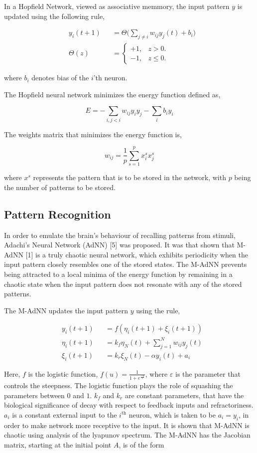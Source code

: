 \documentclass[12pt, letterpaper]{article}
\begin{document}
In a Hopfield Network, viewed as associative memmory, the input pattern $y$ is updated using the following rule,

$$
\begin{aligned}
& y_i(t+1) &&= \Theta\big(\sum_{j \neq i} w_{ij}y_j(t) + b_i \big)\\
& \Theta(z) &&= \begin{cases}
  +1, & z > 0.\\
  -1, & z \le 0.
  \end{cases}
\end{aligned}
$$

where $b_i$ denotes bias of the $i$'th neuron.

The Hopfield neural network minimizes the energy function defined as,

$$
E = -\sum_{i,j < i} w_{ij}y_i y_j - \sum_{i} b_i y_i
$$

The weights matrix that minimizes the energy function is,

$$
w_{ij} = \frac{1}{p} \sum_{s=1}^p x_i^s x_j^s
$$

where $x^s$ represents the pattern that is to be stored in the network, with $p$ being the number of patterns to be stored.

\subsection*{Pattern Recognition}

In order to emulate the brain's behaviour of recalling patterns from stimuli, Adachi’s Neural Network (AdNN) [5] was proposed. It was that shown that M-AdNN [1] is a truly chaotic neural network, which exhibits periodicity when the input pattern closely resembles one of the stored states. The M-AdNN prevents being attracted to a local minima of the energy function by remaining in a chaotic state when the input pattern does not resonate with any of the stored patterns.

The M-AdNN updates the input pattern $y$ using the rule,

$$
\begin{aligned}
& y_i(t+1) &&= f(\eta_i(t+1) + \xi_i(t+1))\\
& \eta_i(t+1) &&= k_f \eta_N(t) + \sum_{j = 1}^N w_{ij} y_j(t)\\
& \xi_i(t+1) &&= k_r \xi_N(t) - \alpha y_i(t) + a_i
\end{aligned}
$$

Here, $f$ is the logistic function, $f(u) = \frac{1}{1 + e^\frac{-u}{\varepsilon}}$, where $\varepsilon$ is the parameter that controls the steepness. The logistic function plays the role of squashing the parameters between $0$ and $1$. $k_f$ and $k_r$ are constant parameters, that have the biological significance of decay with respect to feedback inputs and refractoriness. $a_i$ is a constant external input to the $i^{\text{th}}$ neuron, which is taken to be $a_i = y_i$, in order to make network more receptive to the input. It is shown that M-AdNN is chaotic using analysis of the lyapunov spectrum. The M-AdNN has the Jacobian matrix, starting at the initial point $A$, is of the form
\end{document}
